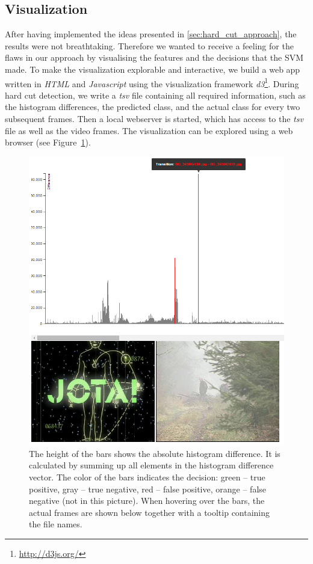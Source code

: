 \subsection{Visualization}
\label{sec:hard_cut_visualization}

After having implemented the ideas presented in \ref{sec:hard_cut_approach}, the results were not breathtaking.
Therefore we wanted to receive a feeling for the flaws in our approach by visualising the features and the decisions that the SVM made.
To make the visualization explorable and interactive, we build a web app written in \emph{HTML} and \emph{Javascript} using the visualization framework \emph{d3}\footnote{\url{http://d3js.org/}}.
During hard cut detection, we write a \emph{tsv} file containing all required information, such as the histogram differences, the predicted class, and the actual class for every two subsequent frames.
Then a local webserver is started, which has access to the \emph{tsv} file as well as the video frames.
The visualization can be explored using a web browser (see Figure~\ref{fig:hard_cut_visualization}).

\begin{figure}
	\centering
	\includegraphics[scale=.7]{images/hard_cut_visualization.png}
	\caption{The height of the bars shows the absolute histogram difference.
    It is calculated by summing up all elements in the histogram difference vector.
    The color of the bars indicates the decision: green -- true positive, gray -- true negative, red -- false positive, orange -- false negative (not in this picture).
    When hovering over the bars, the actual frames are shown below together with a tooltip containing the file names.}
	\label{fig:hard_cut_visualization}
\end{figure}

